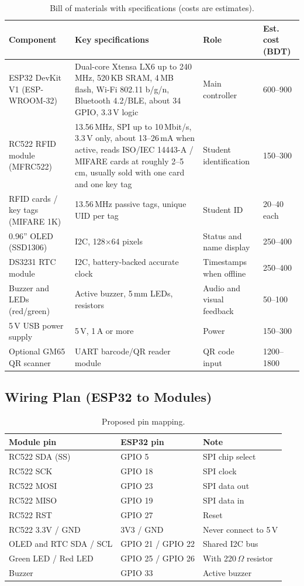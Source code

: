 \documentclass[11pt,a4paper]{article}
\begin{document}
\begin{table}[H]
\centering
\small
\begin{tabular}{p{2.9cm}p{6.4cm}p{1.6cm}p{1.5cm}}
\toprule
\textbf{Component} & \textbf{Key specifications} & \textbf{Role} & \textbf{Est. cost (BDT)}\\
\midrule
ESP32 DevKit V1 (ESP-WROOM-32) & Dual-core Xtensa LX6 up to 240\,MHz, 520\,KB SRAM, 4\,MB flash, Wi-Fi 802.11 b/g/n, Bluetooth 4.2/BLE, about 34 GPIO, 3.3\,V logic & Main controller & 600--900\\
RC522 RFID module (MFRC522) & 13.56\,MHz, SPI up to 10\,Mbit/s, 3.3\,V only, about 13--26\,mA when active, reads ISO/IEC 14443-A / MIFARE cards at roughly 2--5\,cm, usually sold with one card and one key tag & Student identification & 150--300\\
RFID cards / key tags (MIFARE 1K) & 13.56\,MHz passive tags, unique UID per tag & Student ID & 20--40 each\\
0.96'' OLED (SSD1306) & I2C, 128$\times$64 pixels & Status and name display & 250--400\\
DS3231 RTC module & I2C, battery-backed accurate clock & Timestamps when offline & 250--400\\
Buzzer and LEDs (red/green) & Active buzzer, 5\,mm LEDs, resistors & Audio and visual feedback & 50--100\\
5\,V USB power supply & 5\,V, 1\,A or more & Power & 150--300\\
Optional GM65 QR scanner & UART barcode/QR reader module & QR code input & 1200--1800\\
\bottomrule
\end{tabular}
\caption{Bill of materials with specifications (costs are estimates).}
\end{table}
 
\subsection{Wiring Plan (ESP32 to Modules)}
\begin{table}[H]
\centering
\small
\begin{tabular}{lll}
\toprule
\textbf{Module pin} & \textbf{ESP32 pin} & \textbf{Note}\\
\midrule
RC522 SDA (SS) & GPIO 5 & SPI chip select\\
RC522 SCK & GPIO 18 & SPI clock\\
RC522 MOSI & GPIO 23 & SPI data out\\
RC522 MISO & GPIO 19 & SPI data in\\
RC522 RST & GPIO 27 & Reset\\
RC522 3.3V / GND & 3V3 / GND & Never connect to 5\,V\\
OLED and RTC SDA / SCL & GPIO 21 / GPIO 22 & Shared I2C bus\\
Green LED / Red LED & GPIO 25 / GPIO 26 & With 220\,$\Omega$ resistor\\
Buzzer & GPIO 33 & Active buzzer\\
\bottomrule
\end{tabular}
\caption{Proposed pin mapping.}
\end{table}
 
\end{document}
